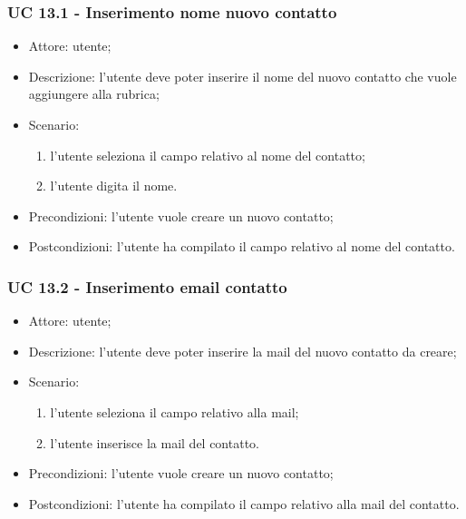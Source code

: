 \subsubsection{UC 13.1 - Inserimento nome nuovo contatto} \label{sec: UC 13.1}
\begin{itemize}
    \item Attore: utente;
    \item Descrizione: l'utente deve poter inserire il nome del nuovo contatto che vuole aggiungere alla rubrica;
    \item Scenario:
        \begin{enumerate}
        \item l'utente seleziona il campo relativo al nome del contatto;
        \item l'utente digita il nome.
        \end{enumerate}
    
    \item Precondizioni: l'utente vuole creare un nuovo contatto;
    \item Postcondizioni: l'utente ha compilato il campo relativo al nome del contatto.
\end{itemize}


\subsubsection{UC 13.2 - Inserimento email contatto} \label{sec: UC 13.2}
\begin{itemize}
    \item Attore: utente;
    \item Descrizione: l'utente deve poter inserire la mail del nuovo contatto da creare;
    \item Scenario:
        \begin{enumerate}
        \item l'utente seleziona il campo relativo alla mail;
        \item l'utente inserisce la mail del contatto.
        \end{enumerate}
    
    \item Precondizioni: l'utente vuole creare un nuovo contatto;
    \item Postcondizioni: l'utente ha compilato il campo relativo alla mail del contatto.
\end{itemize}


